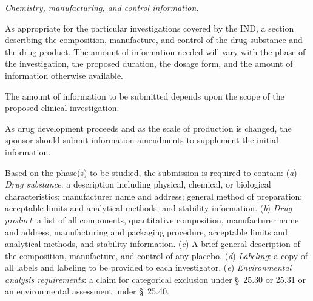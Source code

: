 \begin{description}[leftmargin=0.5cm,style=sameline]
\item[(7)] \textit{Chemistry, manufacturing, and control information.}
\begin{description}[leftmargin=0.8cm,style=sameline]
\item[(i)] As appropriate for the particular investigations covered by the IND, a section describing the composition, manufacture, and control of the drug substance and the drug product. The amount of information needed will vary with the phase of the investigation, the proposed duration, the dosage form, and the amount of information otherwise available.
\item[(ii)] The amount of information to be submitted depends upon the scope of the proposed clinical investigation.
\item[(iii)] As drug development proceeds and as the scale of production is changed, the sponsor should submit information amendments to supplement the initial information.
\item[(iv)] Based on the phase(s) to be studied, the submission is required to contain: (\textit{a}) \textit{Drug substance}: a description including physical, chemical, or biological characteristics; manufacturer name and address; general method of preparation; acceptable limits and analytical methods; and stability information. (\textit{b}) \textit{Drug product}: a list of all components, quantitative composition, manufacturer name and address, manufacturing and packaging procedure, acceptable limits and analytical methods, and stability information. (\textit{c}) A brief general description of the composition, manufacture, and control of any placebo. (\textit{d}) \textit{Labeling}: a copy of all labels and labeling to be provided to each investigator. (\textit{e}) \textit{Environmental analysis requirements}: a claim for categorical exclusion under \S~25.30 or 25.31 or an environmental assessment under \S~25.40.
\end{description}


\end{description}
